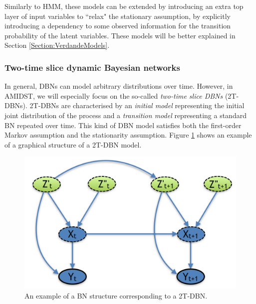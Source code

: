 Similarly to HMM, these models can be extended by introducing an extra top layer of input variables to ``relax" the stationary assumption, by explicitly introducing a dependency to some observed information for the transition probability of the latent variables. These models will be better explained in Section \ref{Section:VerdandeModels}.

\subsubsection{Two-time slice dynamic Bayesian networks}\label{SubSubSection:2DBNs}	

In general, DBNs can model arbitrary distributions over time. However, in AMIDST,  we will especially focus on the so-called \textit{two-time slice DBNs} (2T-DBNs). 2T-DBNs are characterised by an \textit{initial model} representing the initial joint distribution of the process and a \textit{transition model} representing a standard BN repeated over time. This kind of DBN model satisfies both the first-order Markov assumption and the stationarity assumption. Figure \ref{Figure:DBN} shows an example of a graphical structure of a 2T-DBN model. 

\begin{figure}[ht!]
\begin{center}
\includegraphics[scale=0.3]{./figures/PreliminariesDBN}
\caption{\label{Figure:DBN}An example of a BN structure corresponding to a 2T-DBN.}
\end{center}
\end{figure}

